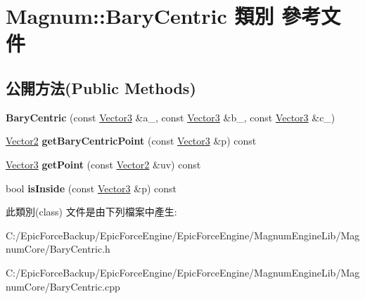 \hypertarget{class_magnum_1_1_bary_centric}{}\section{Magnum\+:\+:Bary\+Centric 類別 參考文件}
\label{class_magnum_1_1_bary_centric}
\subsection*{公開方法(Public Methods)}
\begin{DoxyCompactItemize}
\item 
{\bfseries Bary\+Centric} (const \hyperlink{class_magnum_1_1_vector3}{Vector3} \&a\+\_\+, const \hyperlink{class_magnum_1_1_vector3}{Vector3} \&b\+\_\+, const \hyperlink{class_magnum_1_1_vector3}{Vector3} \&c\+\_\+)\hypertarget{class_magnum_1_1_bary_centric_a0b354c28dc3da0b615ffda662e5a4e53}{}\label{class_magnum_1_1_bary_centric_a0b354c28dc3da0b615ffda662e5a4e53}

\item 
\hyperlink{class_magnum_1_1_vector2}{Vector2} {\bfseries get\+Bary\+Centric\+Point} (const \hyperlink{class_magnum_1_1_vector3}{Vector3} \&p) const \hypertarget{class_magnum_1_1_bary_centric_a4b3084909d9593c059d4e196cc86bc6f}{}\label{class_magnum_1_1_bary_centric_a4b3084909d9593c059d4e196cc86bc6f}

\item 
\hyperlink{class_magnum_1_1_vector3}{Vector3} {\bfseries get\+Point} (const \hyperlink{class_magnum_1_1_vector2}{Vector2} \&uv) const \hypertarget{class_magnum_1_1_bary_centric_aa27a4543e21dcb66bcb9c06d69ea4c45}{}\label{class_magnum_1_1_bary_centric_aa27a4543e21dcb66bcb9c06d69ea4c45}

\item 
bool {\bfseries is\+Inside} (const \hyperlink{class_magnum_1_1_vector3}{Vector3} \&p) const \hypertarget{class_magnum_1_1_bary_centric_a6f08a57eb77c86561f9a178cd5661692}{}\label{class_magnum_1_1_bary_centric_a6f08a57eb77c86561f9a178cd5661692}

\end{DoxyCompactItemize}


此類別(class) 文件是由下列檔案中產生\+:\begin{DoxyCompactItemize}
\item 
C\+:/\+Epic\+Force\+Backup/\+Epic\+Force\+Engine/\+Epic\+Force\+Engine/\+Magnum\+Engine\+Lib/\+Magnum\+Core/Bary\+Centric.\+h\item 
C\+:/\+Epic\+Force\+Backup/\+Epic\+Force\+Engine/\+Epic\+Force\+Engine/\+Magnum\+Engine\+Lib/\+Magnum\+Core/Bary\+Centric.\+cpp\end{DoxyCompactItemize}
